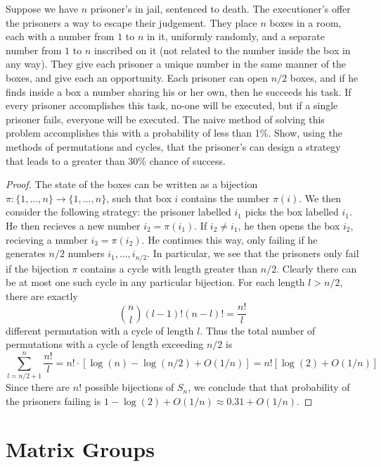 \begin{exercise}
    Suppose we have $n$ prisoner's in jail, sentenced to death. The executioner's offer the prisoners a way to escape their judgement. They place $n$ boxes in a room, each with a number from $1$ to $n$ in it, uniformly randomly, and a separate number from $1$ to $n$ inscribed on it (not related to the number inside the box in any way). They give each prisoner a unique number in the same manner of the boxes, and give each an opportunity. Each prisoner can open $n/2$ boxes, and if he finds inside a box a number sharing his or her own, then he succeeds his task. If every prisoner accomplishes this task, no-one will be executed, but if a single prisoner fails, everyone will be executed. The naive method of solving this problem accomplishes this with a probability of less than 1\%. Show, using the methods of permutations and cycles, that the prisoner's can design a strategy that leads to a greater than 30\% chance of success.
\end{exercise}
\begin{proof}
    The state of the boxes can be written as a bijection $\pi: \{ 1, \dots, n \} \to \{ 1, \dots, n \}$, such that box $i$ contains the number $\pi(i)$. We then consider the following strategy: the prisoner labelled $i_1$ picks the box labelled $i_1$. He then recieves a new number $i_2 = \pi(i_1)$. If $i_2 \neq i_1$, he then opens the box $i_2$, recieving a number $i_3 = \pi(i_2)$. He continues this way, only failing if he generates $n/2$ numbers $i_1, \dots, i_{n/2}$. In particular, we see that the prisoners only fail if the bijection $\pi$ contains a cycle with length greater than $n/2$. Clearly there can be at most one such cycle in any particular bijection. For each length $l > n/2$, there are exactly
    \[ {n \choose l} (l-1)! (n-l)! = \frac{n!}{l} \]
    different permutation with a cycle of length $l$. Thus the total number of permutations with a cycle of length exceeding $n/2$ is
    \[ \sum_{l = n/2 + 1}^n \frac{n!}{l} = n! \cdot [\log(n) - \log(n/2) + O(1/n)] = n![\log(2) + O(1/n)] \]
    Since there are $n!$ possible bijections of $S_n$, we conclude that that probability of the prisoners failing is $1 - \log(2) + O(1/n) \approx 0.31 + O(1/n)$.
\end{proof}







\section{Matrix Groups}







